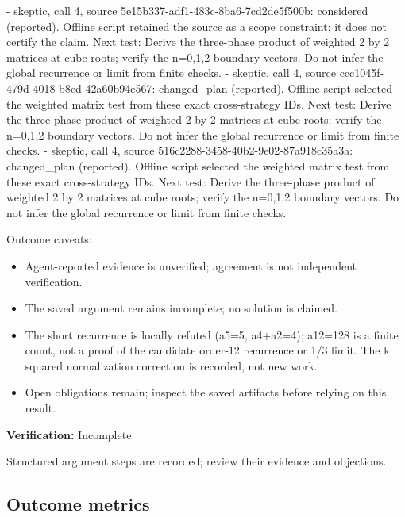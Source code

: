 \documentclass[11pt]{article}
\begin{document}
- skeptic, call 4, source 5e15b337-adf1-483c-8ba6-7cd2de5f500b: considered (reported). Offline script retained the source as a scope constraint; it does not certify the claim. Next test: Derive the three-phase product of weighted 2 by 2 matrices at cube roots; verify the n=0,1,2 boundary vectors. Do not infer the global recurrence or limit from finite checks.
- skeptic, call 4, source ccc1045f-479d-4018-b8ed-42a60b94e567: changed\_plan (reported). Offline script selected the weighted matrix test from these exact cross-strategy IDs. Next test: Derive the three-phase product of weighted 2 by 2 matrices at cube roots; verify the n=0,1,2 boundary vectors. Do not infer the global recurrence or limit from finite checks.
- skeptic, call 4, source 516c2288-3458-40b2-9e02-87a918c35a3a: changed\_plan (reported). Offline script selected the weighted matrix test from these exact cross-strategy IDs. Next test: Derive the three-phase product of weighted 2 by 2 matrices at cube roots; verify the n=0,1,2 boundary vectors. Do not infer the global recurrence or limit from finite checks.\par
Outcome caveats:\par
\begin{itemize}
\item Agent-reported evidence is unverified; agreement is not independent verification.
\item The saved argument remains incomplete; no solution is claimed.
\item The short recurrence is locally refuted (a5=5, a4+a2=4); a12=128 is a finite count, not a proof of the candidate order-12 recurrence or 1/3 limit. The k squared normalization correction is recorded, not new work.
\item Open obligations remain; inspect the saved artifacts before relying on this result.
\end{itemize}
\textbf{Verification:} Incomplete\par
Structured argument steps are recorded; review their evidence and objections.\par
\subsection{Outcome metrics}
\end{document}
